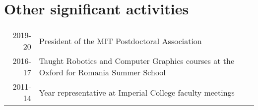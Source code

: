\documentclass[a4paper,10pt]{article} %
\begin{document}
\section*{Other significant activities}
\begin{tabular}{r|p{15cm}}
2019-20 & President of the MIT Postdoctoral Association\\
2016-17 & Taught Robotics and Computer Graphics courses at the Oxford for Romania Summer School\\
2011-14 & Year representative at Imperial College faculty meetings\\
\end{tabular}


\end{document}
